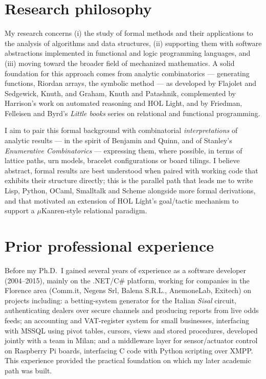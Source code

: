 \documentclass[11pt,a4paper]{article}
\begin{document}
\section*{Research philosophy}

My research concerns (i) the study of formal methods and their applications to the analysis of algorithms and data structures, (ii) supporting them with software abstractions implemented in functional and logic programming languages, and (iii) moving toward the broader field of mechanized mathematics. A solid foundation for this approach comes from analytic combinatorics --- generating functions, Riordan arrays, the symbolic method --- as developed by Flajolet and Sedgewick, Knuth, and Graham, Knuth and Patashnik, complemented by Harrison's work on automated reasoning and HOL Light, and by Friedman, Felleisen and Byrd's \emph{Little books} series on relational and functional programming.

I aim to pair this formal background with combinatorial \emph{interpretations} of analytic results --- in the spirit of Benjamin and Quinn, and of Stanley's \emph{Enumerative Combinatorics} --- expressing them, where possible, in terms of lattice paths, urn models, bracelet configurations or board tilings. I believe abstract, formal results are best understood when paired with working code that exhibits their structure directly; this is the parallel path that leads me to write Lisp, Python, OCaml, Smalltalk and Scheme alongside more formal derivations, and that motivated an extension of HOL Light's goal/tactic mechanism to support a $\mu$Kanren-style relational paradigm.

\section*{Prior professional experience}

Before my Ph.D.\ I gained several years of experience as a software developer (2004--2015), mainly on the .NET/C\# platform, working for companies in the Florence area (Comm.it, Negens Srl, Balena S.R.L., AnemoneLab, Exitech) on projects including: a betting-system generator for the Italian \emph{Sisal} circuit, authenticating dealers over secure channels and producing reports from live odds feeds; an accounting and VAT-register system for small businesses, interfacing with MSSQL using pivot tables, cursors, views and stored procedures, developed jointly with a team in Milan; and a middleware layer for sensor/actuator control on Raspberry Pi boards, interfacing C code with Python scripting over XMPP. This experience provided the practical foundation on which my later academic path was built.
\end{document}
